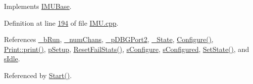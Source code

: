Implements \hyperlink{class_i_m_u_base_a74d84beba0da335f49aa7ce94612cf13}{IMUBase}.



Definition at line \hyperlink{_i_m_u_8cpp_source_l00194}{194} of file \hyperlink{_i_m_u_8cpp_source}{IMU.cpp}.



References \hyperlink{_i_m_u_8h_source_l00107}{\_\-bRun}, \hyperlink{_i_m_u_8h_source_l00091}{\_\-numChans}, \hyperlink{_i_m_u_8h_source_l00113}{\_\-pDBGPort2}, \hyperlink{_i_m_u_8h_source_l00085}{\_\-State}, \hyperlink{_i_m_u_8cpp_source_l00803}{Configure()}, \hyperlink{_print_8cpp_source_l00045}{Print::print()}, \hyperlink{_i_m_u_8h_source_l00062}{pSetup}, \hyperlink{_i_m_u_8h_source_l00200}{ResetFailStats()}, \hyperlink{_i_m_u_8h_source_l00044}{sConfigure}, \hyperlink{_i_m_u_8h_source_l00045}{sConfigured}, \hyperlink{_i_m_u_8h_source_l00178}{SetState()}, and \hyperlink{_i_m_u_8h_source_l00043}{sIdle}.



Referenced by \hyperlink{_i_m_u_8cpp_source_l00239}{Start()}.



